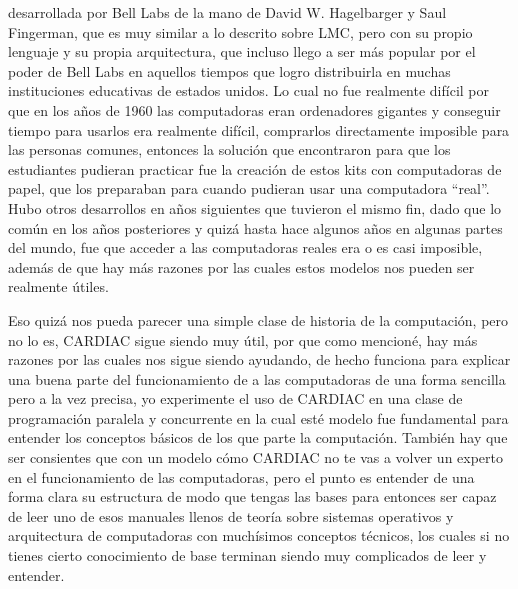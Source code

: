 \documentclass[letterpaper,12pt,oneside]{book}
\begin{document}
	desarrollada por Bell Labs de la mano de David W. Hagelbarger y Saul Fingerman, que es
	muy similar a lo descrito sobre LMC, pero con su propio lenguaje y su propia arquitectura, que incluso llego a ser  más popular
	por el poder de Bell Labs en aquellos tiempos que logro distribuirla en muchas instituciones educativas de estados unidos.
	Lo cual no fue realmente difícil por que en  los años de 1960 
	las computadoras eran ordenadores gigantes y conseguir tiempo para usarlos era realmente difícil, comprarlos directamente imposible para las personas
	comunes, entonces la solución que encontraron para que los estudiantes pudieran practicar fue la creación de estos kits con computadoras de papel, que los
	preparaban  para cuando pudieran usar una computadora ``real''.
	 Hubo otros desarrollos en años siguientes que tuvieron el mismo fin, dado que lo común en los años posteriores y quizá hasta hace algunos años en algunas partes del mundo, fue que acceder a las computadoras reales era o es casi imposible,
	además de que hay más razones por las cuales estos modelos nos pueden ser realmente útiles.

	Eso quizá nos pueda parecer una simple clase de historia de la computación, pero no lo es, CARDIAC sigue siendo muy útil, por que como mencioné, hay más razones por las cuales nos sigue siendo ayudando, de hecho
	funciona para explicar una buena parte del funcionamiento de a las computadoras de una forma sencilla pero a la vez precisa, yo experimente el uso de CARDIAC en una clase de programación paralela y concurrente en la 
	cual esté modelo
	fue fundamental para entender los conceptos básicos de los que parte la computación. También hay que ser consientes que con un modelo cómo CARDIAC no te vas a volver un experto en 
	el funcionamiento de las computadoras,
	pero el punto es entender de una forma clara su estructura de modo que tengas las bases para entonces ser capaz de leer uno de esos manuales llenos de teoría sobre sistemas
	operativos y arquitectura de computadoras con muchísimos conceptos técnicos, los cuales si no tienes cierto conocimiento de base terminan siendo muy complicados de leer y entender.
	
\end{document}
